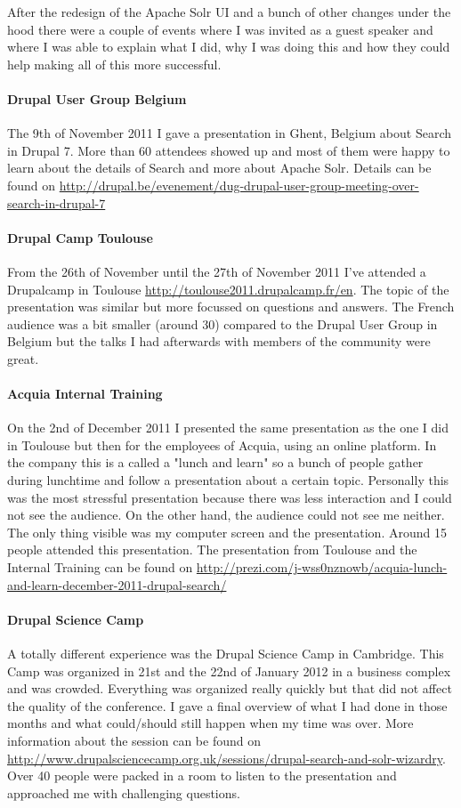 After the redesign of the Apache Solr UI and a bunch of other changes under the hood there were a couple of events where I was invited as a guest speaker and where I was able to explain what I did, why I was doing this and how they could help making all of this more successful.
 
\paragraph{Drupal User Group Belgium} The 9th of November 2011 I gave a presentation in Ghent, Belgium about Search in Drupal 7. More than 60 attendees showed up and most of them were happy to learn about the details of Search and more about Apache Solr. Details can be found on \url{http://drupal.be/evenement/dug-drupal-user-group-meeting-over-search-in-drupal-7}

\paragraph{Drupal Camp Toulouse} From the 26th of November until the 27th of November 2011 I've attended a Drupalcamp in Toulouse \url{http://toulouse2011.drupalcamp.fr/en}. The topic of the presentation was similar but more focussed on questions and answers. The French audience was a bit smaller (around 30) compared to the Drupal User Group in Belgium but the talks I had afterwards with members of the community were great.

\paragraph{Acquia Internal Training} On the 2nd of December 2011 I presented the same presentation as the one I did in Toulouse but then for the employees of Acquia, using an online platform. In the company this is a called a "lunch and learn" so a bunch of people gather during lunchtime and follow a presentation about a certain topic. Personally this was the most stressful presentation because there was less interaction and I could not see the audience. On the other hand, the audience could not see me neither. The only thing visible was my computer screen and the presentation. Around 15 people attended this presentation. The presentation from Toulouse and the Internal Training can be found on \url{http://prezi.com/j-wss0nznowb/acquia-lunch-and-learn-december-2011-drupal-search/}

\paragraph{Drupal Science Camp} A totally different experience was the Drupal Science Camp in Cambridge. This Camp was organized in 21st and the 22nd of January 2012 in a business complex and was crowded. Everything was organized really quickly but that did not affect the quality of the conference. I gave a final overview of what I had done in those months and what could/should still happen when my time was over. More information about the session can be found on \url{http://www.drupalsciencecamp.org.uk/sessions/drupal-search-and-solr-wizardry}. Over 40 people were packed in a room to listen to the presentation and approached me with challenging questions. 

